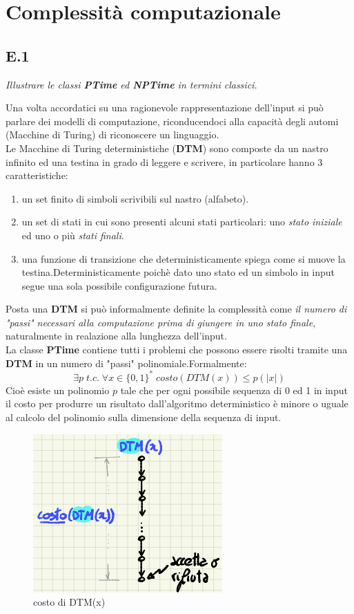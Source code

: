 \documentclass[a4paper]{article}
\begin{document}
\newpage
\section{Complessità computazionale}
\subsection{E.1}
\emph{Illustrare le classi \textbf{PTime} ed \textbf{NPTime} in termini classici.}


Una volta accordatici su una ragionevole rappresentazione dell'input si può parlare dei modelli di computazione, riconducendoci alla capacità degli automi (Macchine di Turing) di riconoscere un linguaggio.\\
Le Macchine di Turing deterministiche (\textbf{DTM}) sono composte da un nastro infinito ed una testina in grado di leggere e scrivere, in particolare hanno 3 caratteristiche:
\begin{enumerate}
	\item un set finito di simboli scrivibili sul nastro (alfabeto).
	\item un set di stati in cui sono presenti alcuni stati particolari: uno \textit{stato iniziale} ed uno o più \textit{stati finali}.
	\item una funzione di transizione che deterministicamente spiega come si muove la testina.Deterministicamente poichè dato uno stato ed un simbolo in input segue una sola possibile configurazione futura.
\end{enumerate}
Posta una \textbf{DTM} si può informalmente definite la complessità come \textit{il numero di "passi" necessari alla computazione prima di giungere in uno stato finale}, naturalmente in realazione alla lunghezza dell'input.\\
La classe \textbf{PTime} contiene tutti i problemi che possono essere risolti tramite una \textbf{DTM} in un numero di "passi" polinomiale.Formalmente: $$\exists p \; t.c. \; \forall x \in \{0,1\}^* \; costo(DTM(x)) \leq p(\lvert x \rvert)$$
Cioè esiste un polinomio $p$ tale che per ogni possibile sequenza di 0 ed 1 in input il costo per produrre un risultato dall'algoritmo deterministico è minore o uguale al calcolo del polinomio sulla dimensione della sequenza di input.
\begin{figure}[!ht]
\centering
\includegraphics[scale = 0.6]{./img/E1_DTM.png}
\caption{costo di DTM(x)} \label{FIG:E1_DTM}
\end{figure}\\
\end{document}

